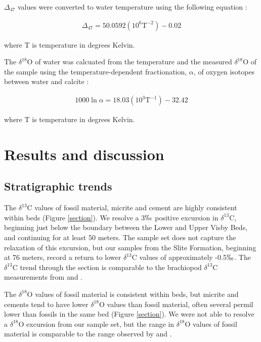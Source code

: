 \documentclass{article}
\newcommand{\deltao}{$\delta^{18}$}
\newcommand{\deltac}{$\delta^{13}$}
\begin{document}
$\Delta_{47}$ values were converted to water temperature using the following equation \citep{Ghosh2006}:

\begin{align}
\Delta_{47}=50.0592\left(10^6\text{T}^{-2}\right)-0.02
\end{align}

\noindent where T is temperature in degrees Kelvin. 

The \deltao O of water was calcuated from the temperature and the measured \deltao O of the sample using the temperature-dependent fractionation, $\alpha$, of oxygen isotopes between water and calcite \citep{Kim1997}:

\begin{align}
1000\ln\alpha=18.03\left(10^3\text{T}^{-1}\right)-32.42
\end{align}

\noindent where T is temperature in degrees Kelvin. 

\section{Results and discussion}

\subsection{Stratigraphic trends}

The \deltac C values of fossil material, micrite and cement are highly consistent within beds (Figure \ref{section}). We resolve a 3$\permil$ positive excursion in \deltac C, beginning just below the boundary between the Lower and Upper Visby Beds, and continuing for at least 50 meters. The sample set does not capture the relaxation of this excursion, but our samples from the Slite Formation, beginning at 76 meters, record a return to lower \deltac C values of approximately -0.5$\permil$. The \deltac C trend through the section is comparable to the brachiopod \deltac C measurements from \cite{Bickert1997} and \cite{Munnecke2003}. 

The \deltao O values of fossil material is consistent within beds, but micrite and cements tend to have lower \deltao O values than fossil material, often several permil lower than fossils in the same bed (Figure \ref{section}). We were not able to resolve a \deltao O excursion from our sample set, but the range in \deltao O values of fossil material is comparable to the range observed by \cite{Bickert1997} and \cite{Munnecke2003}. 
\end{document}
